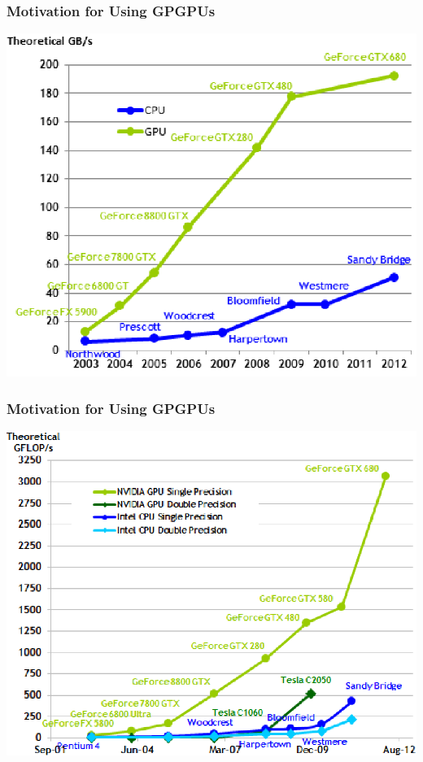 \documentclass{beamer}
\begin{document}
\begin{frame}[fragile,t]
\frametitle{Motivation for Using GPGPUs}

\begin{center}
\includegraphics[height=45ex]{Figures/Lab1/Bandwidth.png}
\end  {center}

\end{frame}

\begin{frame}[fragile,t]
\frametitle{Motivation for Using GPGPUs}

\begin{center}
\includegraphics[height=43ex]{Figures/Lab1/GFlops.png}
\end  {center}

\end{frame}
\end{document}
